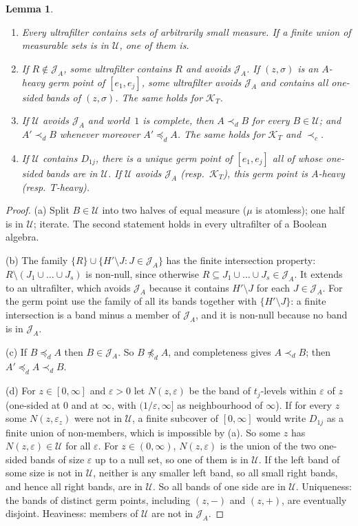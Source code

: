 \documentclass[11pt]{article}
\newtheorem{lemma}[theorem]{Lemma}
\theoremstyle{definition}\newtheorem{definition}[theorem]{Definition}
\theoremstyle{remark}\newtheorem{remark}[theorem]{Remark}
\newcommand{\Jid}{\mathcal J}
\newcommand{\Kid}{\mathcal K}
\newcommand{\Uf}{\mathcal U}
\begin{document}
\begin{lemma}\label{lem:uf}
\begin{enumerate}[label=(\alph*)]
\item Every ultrafilter contains sets of arbitrarily small measure. If a
finite union of measurable sets is in $\Uf$, one of them is.
\item If $R\notin\Jid_A$, some ultrafilter contains $R$ and avoids $\Jid_A$.
If $(z,\sigma)$ is an $A$-heavy germ point of $[e_1,e_j]$, some ultrafilter
avoids $\Jid_A$ and contains all one-sided bands of $(z,\sigma)$. The same
holds for $\Kid_T$.
\item If $\Uf$ avoids $\Jid_A$ and world~$1$ is complete, then
$A\prec_dB$ for every $B\in\Uf$; and $A'\prec_dB$ whenever moreover
$A'\preceq_dA$. The same holds for $\Kid_T$ and $\prec_c$.
\item If $\Uf$ contains $D_{1j}$, there is a unique germ point of $[e_1,e_j]$
all of whose one-sided bands are in $\Uf$. If $\Uf$ avoids $\Jid_A$ (resp.\
$\Kid_T$), this germ point is $A$-heavy (resp.\ $T$-heavy).
\end{enumerate}
\end{lemma}
\begin{proof}
(a) Split $B\in\Uf$ into two halves of equal measure ($\mu$ is atomless); one
half is in $\Uf$; iterate. The second statement holds in every ultrafilter
of a Boolean algebra.

(b) The family $\{R\}\cup\{H'\setminus J:J\in\Jid_A\}$ has the finite
intersection property: $R\setminus(J_1\cup\dots\cup J_s)$ is non-null, since
otherwise $R\subseteq J_1\cup\dots\cup J_s\in\Jid_A$. It extends to an
ultrafilter, which avoids $\Jid_A$ because it contains $H'\setminus J$ for
each $J\in\Jid_A$. For the germ point use the family of all its bands
together with $\{H'\setminus J\}$: a finite intersection is a band minus a
member of $\Jid_A$, and it is non-null because no band is in $\Jid_A$.

(c) If $B\preceq_dA$ then $B\in\Jid_A$. So $B\not\preceq_dA$, and
completeness gives $A\prec_dB$; then $A'\preceq_dA\prec_dB$.

(d) For $z\in[0,\infty]$ and $\varepsilon>0$ let $N(z,\varepsilon)$ be the
band of $t_j$-levels within $\varepsilon$ of $z$ (one-sided at $0$ and at
$\infty$, with $(1/\varepsilon,\infty]$ as neighbourhood of $\infty$). If
for every $z$ some $N(z,\varepsilon_z)$ were not in $\Uf$, a finite subcover
of $[0,\infty]$ would write $D_{1j}$ as a finite union of non-members, which
is impossible by (a). So some $z$ has $N(z,\varepsilon)\in\Uf$ for all
$\varepsilon$. For $z\in(0,\infty)$, $N(z,\varepsilon)$ is the union of the
two one-sided bands of size $\varepsilon$ up to a null set, so one of them is
in $\Uf$. If the left band of some size is not in $\Uf$, neither is any
smaller left band, so all small right bands, and hence all right bands, are
in $\Uf$. So all bands of one side are in $\Uf$. Uniqueness: the bands of
distinct germ points, including $(z,-)$ and $(z,+)$, are eventually
disjoint. Heaviness: members of $\Uf$ are not in $\Jid_A$.
\end{proof}
\end{document}
